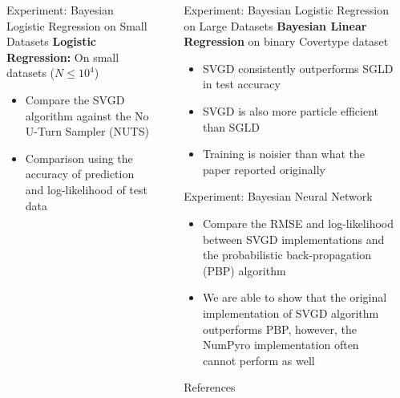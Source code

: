 \documentclass[final]{beamer}
\newlength{\sepwidth}
\newlength{\colwidth}
\newcommand{\separatorcolumn}{\begin{column}{\sepwidth}\end{column}}
\begin{document}
\begin{frame}[t]
\begin{columns}[t]
\begin{column}{\colwidth}
\begin{block}{Experiment: Bayesian Logistic Regression on Small Datasets}
  \textbf{Logistic Regression:} On small datasets ($N \leq 10^4$)
    \begin{itemize}
     \item Compare the SVGD algorithm against the No U-Turn Sampler (NUTS) 
     
     \item Comparison using the accuracy of prediction and log-likelihood of test data
    \end{itemize}
     
  \end{block}

\end{column}

\separatorcolumn

\begin{column}{\colwidth}

  \begin{block}{Experiment: Bayesian Logistic Regression on Large Datasets}
  \textbf{Bayesian Linear Regression} on binary Covertype dataset 
    \begin{itemize}
     \item SVGD \cite{liu2016stein} consistently outperforms SGLD \cite{welling2011bayesian} in test accuracy
     \item SVGD is also more particle efficient than SGLD
     \item Training is noisier than what the paper reported originally
    \end{itemize}
    
  \end{block}
  
  \begin{block}{Experiment: Bayesian Neural Network}
  \begin{itemize}
      \item Compare the RMSE and log-likelihood between SVGD implementations and the probabilistic back-propagation (PBP) algorithm
      
      \item We are able to show that the original implementation of SVGD algorithm outperforms PBP, however, the NumPyro implementation often cannot perform as well
  \end{itemize}
  
  \end{block}
  

  \begin{block}{References}

    \nocite{*}
    \footnotesize{}

  \end{block}
  
\end{column}

\separatorcolumn

\end{columns}
\end{frame}
\end{document}
